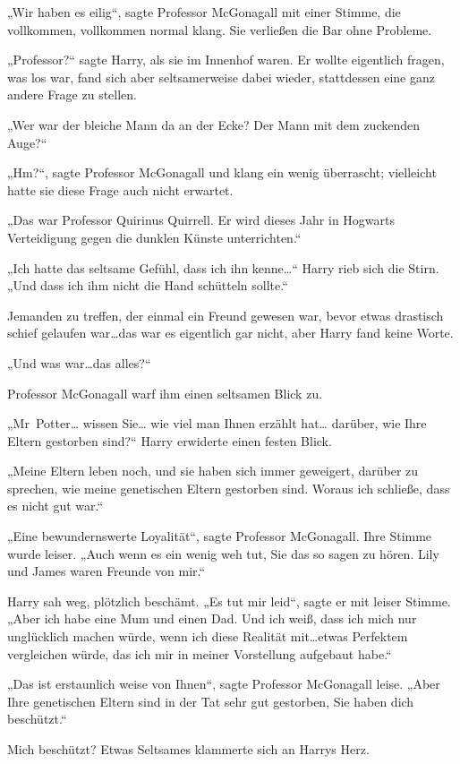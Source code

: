 {„Wir haben es eilig“, sagte Professor McGonagall mit einer Stimme, die vollkommen, vollkommen normal klang. Sie verließen die Bar ohne Probleme.

„Professor?“ sagte Harry, als sie im Innenhof waren. Er wollte eigentlich fragen, was los war, fand sich aber seltsamerweise dabei wieder, stattdessen eine ganz andere Frage zu stellen.

„Wer war der bleiche Mann da an der Ecke? Der Mann mit dem zuckenden Auge?“

„Hm?“, sagte Professor McGonagall und klang ein wenig überrascht; vielleicht hatte sie diese Frage auch nicht erwartet.

„Das war Professor Quirinus Quirrell. Er wird dieses Jahr in Hogwarts Verteidigung gegen die dunklen Künste unterrichten.“

„Ich hatte das seltsame Gefühl, dass ich ihn kenne…“ Harry rieb sich die Stirn. „Und dass ich ihm nicht die Hand schütteln sollte.“

Jemanden zu treffen, der einmal ein Freund gewesen war, bevor etwas drastisch schief gelaufen war…das war es eigentlich gar nicht, aber Harry fand keine Worte.

„Und was war…das alles?“

Professor McGonagall warf ihm einen seltsamen Blick zu.

„Mr~Potter… wissen Sie… wie viel man Ihnen erzählt hat… darüber, wie Ihre Eltern gestorben sind?“ Harry erwiderte einen festen Blick.

„Meine Eltern leben noch, und sie haben sich immer geweigert, darüber zu sprechen, wie meine genetischen Eltern gestorben sind. Woraus ich schließe, dass es nicht gut war.“

„Eine bewundernswerte Loyalität“, sagte Professor McGonagall. Ihre Stimme wurde leiser. „Auch wenn es ein wenig weh tut, Sie das so sagen zu hören. Lily und James waren Freunde von mir.“

Harry sah weg, plötzlich beschämt. „Es tut mir leid“, sagte er mit leiser Stimme. „Aber ich habe eine Mum und einen Dad. Und ich weiß, dass ich mich nur unglücklich machen würde, wenn ich diese Realität mit…etwas Perfektem vergleichen würde, das ich mir in meiner Vorstellung aufgebaut habe.“

„Das ist erstaunlich weise von Ihnen“, sagte Professor McGonagall leise. „Aber Ihre genetischen Eltern sind in der Tat sehr gut gestorben, Sie haben dich beschützt.“

Mich beschützt? Etwas Seltsames klammerte sich an Harrys Herz.

}
